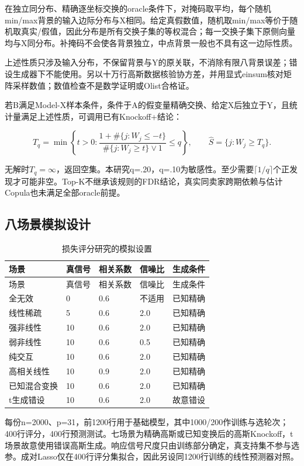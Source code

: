 \documentclass[UTF8,11pt,a4paper]{ctexart}
\begin{document}
在独立同分布、精确逐坐标交换的oracle条件下，对掩码取平均，每个随机min/max背景的输入边际分布与X相同。给定真假数值，随机取min/max等价于随机取真实/假值，因此分布是所有交换子集的等权混合；每一交换子集下原侧向量均与X同分布。补掩码不会使各背景独立，中点背景一般也不具有这一边际性质。

上述性质只涉及输入分布，不保留背景与Y的原关联，不消除有限八背景误差；错设生成器下不能使用。另以十万行高斯数据核验协方差，并用显式einsum核对矩阵采样数值；数值检查不是数学证明或Olist合格证。

若B满足Model-X样本条件，条件于A的假变量精确交换、给定X后独立于Y，且统计量满足上述性质，可调用已有Knockoff+结论：

\[
T_q=\min\left\{t>0:
\frac{1+\#\{j:W_j\le -t\}}{\#\{j:W_j\ge t\}\vee1}\le q\right\},
\qquad \widehat S=\{j:W_j\ge T_q\}.
\]

无解时\(T_q=\infty\)，返回空集。本研究q=.20，q=.10为敏感性。至少需要\(\lceil1/q\rceil\)个正发现才可能非空。Top-K不继承该规则的FDR结论，真实同卖家跨期依赖与估计Copula也未满足全部oracle前提。

\subsection{八场景模拟设计}

{
\footnotesize
\begin{longtable}[]{@{}lllll@{}}
\caption{损失评分研究的模拟设置}\tabularnewline
\toprule\noalign{}
场景 & 真信号 & 相关系数 & 信噪比 & 生成条件 \\
\midrule\noalign{}
\endfirsthead
\toprule\noalign{}
场景 & 真信号 & 相关系数 & 信噪比 & 生成条件 \\
\midrule\noalign{}
\endhead
\bottomrule\noalign{}
\endlastfoot
全无效 & 0 & 0.6 & 不适用 & 已知精确 \\
线性稀疏 & 5 & 0.6 & 2.0 & 已知精确 \\
强非线性 & 10 & 0.6 & 2.0 & 已知精确 \\
弱非线性 & 10 & 0.6 & 0.5 & 已知精确 \\
纯交互 & 10 & 0.6 & 2.0 & 已知精确 \\
高相关线性 & 10 & 0.9 & 2.0 & 已知精确 \\
已知混合变换 & 10 & 0.6 & 2.0 & 已知精确 \\
t生成错设 & 10 & 0.6 & 2.0 & 故意错设 \\
\end{longtable}
}

每份n=2000、p=31，前1200行用于基础模型，其中1000/200作训练与选轮次；400行评分，400行预测测试。七场景为精确高斯或已知变换后的高斯Knockoff，t场景故意使用错误高斯生成。响应信号尺度只由训练部分确定，真支持集不参与选参。成对Lasso仅在400行评分集拟合，因此另设同1200行训练的线性预测器对照。
\end{document}
